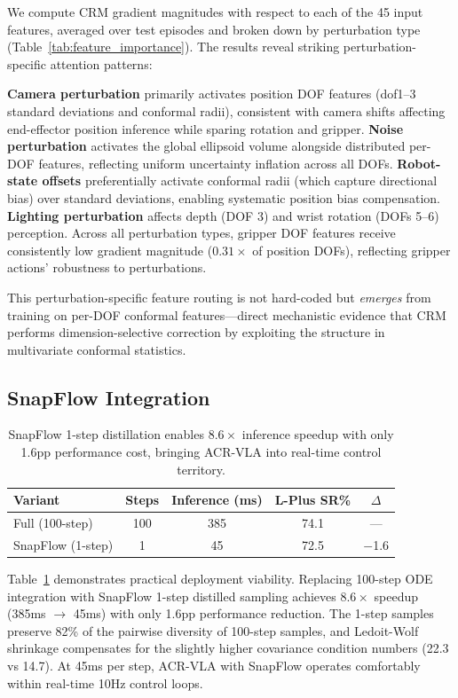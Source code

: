\documentclass[10pt,letterpaper]{article}
\newcommand{\ours}{ACR-VLA}
\newcommand{\crm}{CRM}
\begin{document}
We compute CRM gradient magnitudes with respect to each of the 45 input features, averaged over test episodes and broken down by perturbation type (Table~\ref{tab:feature_importance}).
The results reveal striking perturbation-specific attention patterns:

\textbf{Camera perturbation} primarily activates position DOF features (dof1--3 standard deviations and conformal radii), consistent with camera shifts affecting end-effector position inference while sparing rotation and gripper.
\textbf{Noise perturbation} activates the global ellipsoid volume alongside distributed per-DOF features, reflecting uniform uncertainty inflation across all DOFs.
\textbf{Robot-state offsets} preferentially activate conformal radii (which capture directional bias) over standard deviations, enabling systematic position bias compensation.
\textbf{Lighting perturbation} affects depth (DOF 3) and wrist rotation (DOFs 5--6) perception.
Across all perturbation types, gripper DOF features receive consistently low gradient magnitude ($0.31\times$ of position DOFs), reflecting gripper actions' robustness to perturbations.

This perturbation-specific feature routing is not hard-coded but \emph{emerges} from training on per-DOF conformal features---direct mechanistic evidence that \crm{} performs dimension-selective correction by exploiting the structure in multivariate conformal statistics.

\subsection{SnapFlow Integration}
\label{sec:snapflow}

\begin{table}[t]
\centering
\caption{SnapFlow 1-step distillation enables $8.6\times$ inference speedup with only 1.6pp performance cost, bringing \ours{} into real-time control territory.}
\label{tab:snapflow}
\begin{tabular}{lcccc}
\toprule
\textbf{Variant} & \textbf{Steps} & \textbf{Inference (ms)} & \textbf{L-Plus SR\%} & \textbf{$\Delta$} \\
\midrule
Full (100-step) & 100 & 385 & 74.1 & --- \\
SnapFlow (1-step) & 1 & 45 & 72.5 & $-$1.6 \\
\bottomrule
\end{tabular}
\end{table}

Table~\ref{tab:snapflow} demonstrates practical deployment viability.
Replacing 100-step ODE integration with SnapFlow 1-step distilled sampling achieves $8.6\times$ speedup (385ms $\to$ 45ms) with only 1.6pp performance reduction.
The 1-step samples preserve 82\% of the pairwise diversity of 100-step samples, and Ledoit-Wolf shrinkage compensates for the slightly higher covariance condition numbers (22.3 vs 14.7).
At 45ms per step, \ours{} with SnapFlow operates comfortably within real-time 10Hz control loops.
\end{document}
